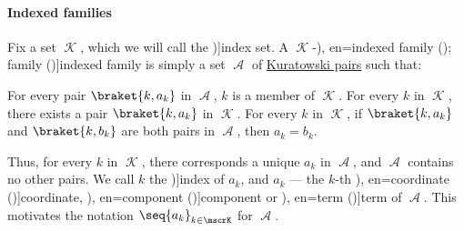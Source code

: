\paragraph{Indexed families}

\begin{definition}\label{def:indexed_family}
  Fix a set \( \mscrK \), which we will call the \term[en=index set (\cite[34]{Halmos1960Sets})]{index set}. A \( \mscrK \)-\term[ru=индексированное семейство (\cite[8]{Архангельский1988Множества}), en=indexed family (\cite[2]{Engelking1989Topology}); family (\cite[34]{Halmos1960Sets})]{indexed family} is simply a set \( \mscrA \) of \hyperref[def:kuratowski_pair]{Kuratowski pairs} such that:
  \begin{thmenum}
     For every pair \( \braket{ k, a_k } \) in \( \mscrA \), \( k \) is a member of \( \mscrK \).
     For every \( k \) in \( \mscrK \), there exists a pair \( \braket{ k, a_k } \) in \( \mscrK \).
     For every \( k \) in \( \mscrK \),  if \( \braket{ k, a_k } \) and \( \braket{ k, b_k } \) are both pairs in \( \mscrA \), then \( a_k = b_k \).
  \end{thmenum}

  Thus, for every \( k \) in \( \mscrK \), there corresponds a unique \( a_k \) in \( \mscrA \), and \( \mscrA \) contains no other pairs. We call \( k \) the \term[en=index (\cite[36]{Halmos1960Sets})]{index} of \( a_k \), and \( a_k \) --- the \( k \)-th \term[ru=координата (\cite[11]{Архангельский1988Множества}), en=coordinate (\cite[36]{Halmos1960Sets})]{coordinate}, \term[bg=компонента (\cite[367]{ГеновМиховскиМоллов1991Алгебра}), en=component (\cite[35]{Enderton1977Sets})]{component} or \term[ru=терм (\cite[11]{Архангельский1988Множества}), en=term (\cite[34]{Halmos1960Sets})]{term} of \( \mscrA \). This motivates the notation \( \seq{ a_k }_{k \in \mscrK} \) for \( \mscrA \).


\end{definition}
